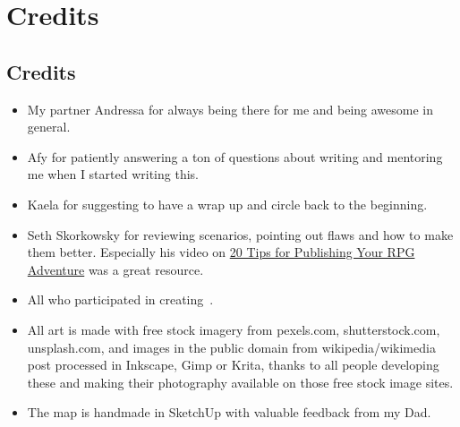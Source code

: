 \documentclass[bg-full]{resources/stylesheets/kult}
\begin{document}
\section{Credits}%
\label{sec:credits}

\subsection*{Credits}

\begin{itemize}[noitemsep]
  \item My partner Andressa for always being there for me and being awesome in general.
  \item Afy for patiently answering a ton of questions about writing and mentoring me when I started writing this.
  \item Kaela for suggesting to have a wrap up and circle back to the beginning.
  \item Seth Skorkowsky for reviewing scenarios, pointing out flaws and how to make them better.  Especially his video on
        \href{https://www.youtube.com/watch?v=MGxO88C5WFI}{20 Tips for Publishing Your RPG Adventure} was a great resource.
  \item All who participated in creating~\cite{KULT:tex}.
  \item All art is made with free stock imagery from pexels.com, shutterstock.com, unsplash.com, and images in the public
        domain from wikipedia/wikimedia post processed in Inkscape, Gimp or Krita, thanks to all people developing these and
        making their photography available on those free stock image sites.
  \item The map is handmade in SketchUp with valuable feedback from my Dad.
\end{itemize}

\clearpage %
%
\printbibliography[title={Bibliography},heading=bibintoc]
\clearpage
\printindex
\end{document}
